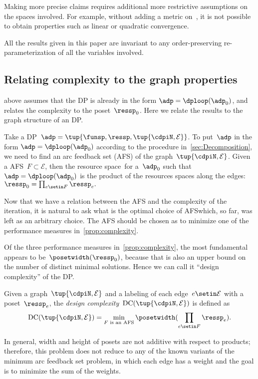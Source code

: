 \begin{remark}
    Making more precise claims requires additional more restrictive assumptions on the spaces involved.
    For example, without adding a metric on~\ressp, it is not possible to obtain properties such as linear or quadratic convergence.
\end{remark}

\begin{remark}
    All the results given in this paper are invariant to any order-preserving re-parameterization of all the variables involved.
\end{remark}

\subsection{Relating complexity to the graph properties}

 above assumes that the DP is already in the form $\adp=\dploop(\adp_{0})$, and relates the complexity to the poset~$\ressp_{0}$.
Here we relate the results to the graph structure of an DP.

Take a DP~$\adp=\tup{ \funsp,\ressp,\tup{ \cdpiN,\mathcal{E}} } $.
To put~$\adp$ in the form $\adp=\dploop(\adp_{0})$ according to the procedure in~\cref{sec:Decomposition}, we need to find an arc feedback set (AFS) of the graph~$\tup{ \cdpiN,\mathcal{E}} $.
Given a AFS~$F\subset\mathcal{E}$, then the resource space~\ressp for a~$\adp_{0}$ such that~$\adp=\dploop(\adp_{0})$ is the product of the resources spaces along the edges: $\ressp_{0}=\prod_{e\setin F}\ressp_{e}.
$

Now that we have a relation between the AFS and the complexity of the iteration, it is natural to ask what is the optimal choice of AFS\textemdash which, so far, was left as an arbitrary choice.
The AFS should be chosen as to minimize one of the performance measures in~\cref{prop:complexity}.

Of the three performance measures in~\cref{prop:complexity}, the most fundamental appears to be~$\posetwidth(\ressp_{0})$, because that is also an upper bound on the number of distinct minimal solutions.
Hence we can call it ``design complexity'' of the DP.
\begin{definition}
    \label{def:design-complexity}
    Given a graph~$\tup{ \cdpiN,\mathcal{E}} $
    and a labeling of each edge~$e\setin\mathcal{E}$ with a poset~$\ressp_{e}$,
    the \emph{design complexity~}$\text{DC}(\tup{ \cdpiN,\mathcal{E}} )$
    is defined as
    \begin{equation}
        \text{DC}(\tup{ \cdpiN,\mathcal{E}} )=\min_{F\text{ is an AFS}}\posetwidth(\prod_{e\setin F}\ressp_{e}).
        \label{eq:complexity}
    \end{equation}
\end{definition}
In general, width and height of posets are not additive with respect to products; therefore, this problem does not reduce to any of the known variants of the minimum arc feedback set problem, in which each edge has a weight and the goal is to minimize the sum of the weights.

